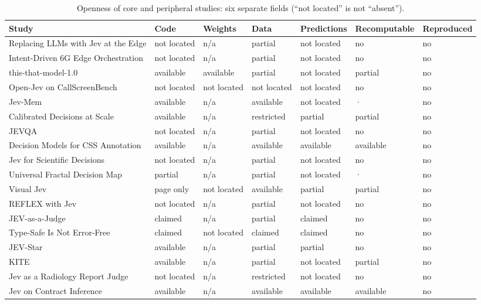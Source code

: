 \begin{table}[tbp]
\centering\footnotesize
\caption{Openness of core and peripheral studies: six separate fields (“not located” is not “absent”).}\label{tab:openness}
\begin{tabularx}{\linewidth}{Xllllll}
\toprule
\textbf{Study} & \textbf{Code} & \textbf{Weights} & \textbf{Data} & \textbf{Predictions} & \textbf{Recomputable} & \textbf{Reproduced} \\
\midrule
Replacing LLMs with Jev at the Edge & not located & n/a & partial & not located & no & no \\
Intent-Driven 6G Edge Orchestration & not located & n/a & partial & not located & no & no \\
this-that-model-1.0 & available & available & partial & not located & partial & no \\
Open-Jev on CallScreenBench & not located & not located & not located & not located & no & no \\
Jev-Mem & available & n/a & available & not located & · & no \\
Calibrated Decisions at Scale & available & n/a & restricted & partial & partial & no \\
JEVQA & not located & n/a & partial & not located & no & no \\
Decision Models for CSS Annotation & available & n/a & available & available & available & no \\
Jev for Scientific Decisions & not located & n/a & partial & not located & no & no \\
Universal Fractal Decision Map & partial & n/a & partial & not located & · & no \\
Visual Jev & page only & not located & available & partial & partial & no \\
REFLEX with Jev & not located & n/a & partial & not located & no & no \\
JEV-as-a-Judge & claimed & n/a & partial & claimed & no & no \\
Type-Safe Is Not Error-Free & claimed & not located & claimed & claimed & no & no \\
JEV-Star & available & n/a & partial & partial & no & no \\
KITE & available & n/a & partial & not located & partial & no \\
Jev as a Radiology Report Judge & not located & n/a & restricted & not located & no & no \\
Jev on Contract Inference & available & n/a & available & available & available & no \\
\bottomrule
\end{tabularx}
\end{table}
